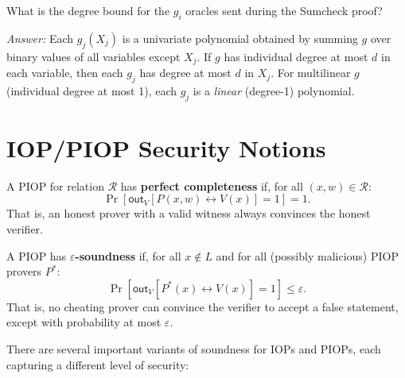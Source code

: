 \documentclass[11pt]{article}
\theoremstyle{plain}
\theoremstyle{definition}
\newcommand{\out}{\mathsf{out}}
\begin{document}
\begin{quizbox}
  What is the degree bound for the $g_i$ oracles sent during the Sumcheck proof?

  \medskip
  \textit{Answer:} Each $g_j(X_j)$ is a univariate polynomial obtained by
  summing $g$ over binary values of all variables except $X_j$. If $g$ has
  individual degree at most $d$ in each variable, then each $g_j$ has degree at
  most $d$ in $X_j$. For multilinear $g$ (individual degree at most 1), each
  $g_j$ is a \emph{linear} (degree-1) polynomial.
\end{quizbox}

\section{IOP/PIOP Security Notions}

\begin{defbox}
A PIOP for relation $\mathcal{R}$ has \textbf{perfect completeness} if, for all
$(x, w) \in \mathcal{R}$:
\[
  \Pr\!\left[\out_V\!\left[P(x,w) \leftrightarrow V(x)\right] = 1\right] = 1.
\]
That is, an honest prover with a valid witness always convinces the honest
verifier.
\end{defbox}

\begin{defbox}
A PIOP has \textbf{$\varepsilon$-soundness} if, for all $x \notin L$ and for
all (possibly malicious) PIOP provers $P^*$:
\[
  \Pr\!\left[\out_V\!\left[P^*(x) \leftrightarrow V(x)\right] = 1\right] \leq \varepsilon.
\]
That is, no cheating prover can convince the verifier to accept a false
statement, except with probability at most $\varepsilon$.
\end{defbox}

There are several important variants of soundness for IOPs and PIOPs,
each capturing a different level of security:
\end{document}
